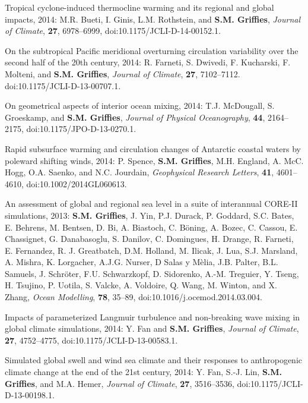\begin{etaremune}
\item Tropical cyclone-induced thermocline warming and its regional
  and global impacts, 2014: M.R. Bueti, I. Ginis, L.M. Rothstein, and
  {\bf S.M. Grif\/f\/ies}, {\it Journal of Climate}, {\bf 27},
  6978--6999, doi:10.1175/JCLI-D-14-00152.1.

\item On the subtropical Pacific meridional overturning circulation
  variability over the second half of the 20th century, 2014:
  R. Farneti, S. Dwivedi, F. Kucharski, F. Molteni, and {\bf
    S.M. Grif\/f\/ies}, {\it Journal of Climate}, {\bf 27},
  7102--7112.  doi:10.1175/JCLI-D-13-00707.1.

\item On geometrical aspects of interior ocean mixing, 2014:
  T.J. McDougall, S. Groeskamp, and {\bf S.M. Grif\/f\/ies}, {\it
    Journal of Physical Oceanography}, {\bf 44}, 2164--2175,
  doi:10.1175/JPO-D-13-0270.1.

\item Rapid subsurface warming and circulation changes of Antarctic
  coastal waters by poleward shifting winds, 2014: P. Spence, {\bf
    S.M. Grif\/f\/ies}, M.H. England, A. McC. Hogg, O.A. Saenko, and
  N.C. Jourdain, {\it Geophysical Research Letters}, {\bf 41},
  4601--4610, doi:10.1002/2014GL060613.

\item An assessment of global and regional sea level in a suite of
  interannual CORE-II simulations, 2013: {\bf S.M. Grif\/f\/ies},
  J. Yin, P.J. Durack, P. Goddard, S.C. Bates, E. Behrens, M. Bentsen,
  D. Bi, A. Biastoch, C. B\"oning, A. Bozec, C. Cassou, E. Chassignet,
  G. Danabasoglu, S. Danilov, C. Domingues, H. Drange, R. Farneti,
  E. Fernandez, R. J. Greatbatch, D.M. Holland, M. Ilicak, J. Lua,
  S.J. Marsland, A. Mishra, K. Lorgacher, A.J.G. Nurser, D Salas y
  M\`elia, J.B.  Palter, B.L. Samuels, J. Schr\"oter,
  F.U. Schwarzkopf, D. Sidorenko, A.-M. Treguier, Y. Tseng,
  H. Tsujino, P. Uotila, S. Valcke, A. Voldoire, Q. Wang, M. Winton,
  and X. Zhang, {\it Ocean Modelling}, {\bf 78}, 35--89,
  doi:10.1016/j.ocemod.2014.03.004.

\item Impacts of parameterized Langmuir turbulence and non-breaking
  wave mixing in global climate simulations, 2014: Y. Fan and {\bf
    S.M. Grif\/f\/ies}, {\it Journal of Climate}, {\bf 27},
  4752--4775, doi:10.1175/JCLI-D-13-00583.1.

\item Simulated global swell and wind sea climate and their responses
  to anthropogenic climate change at the end of the 21st century,
  2014: Y. Fan, S.-J. Lin, {\bf S.M. Grif\/f\/ies}, and M.A. Hemer,
  {\it Journal of Climate}, {\bf 27}, 3516--3536,
  doi:10.1175/JCLI-D-13-00198.1.


\end{etaremune}
